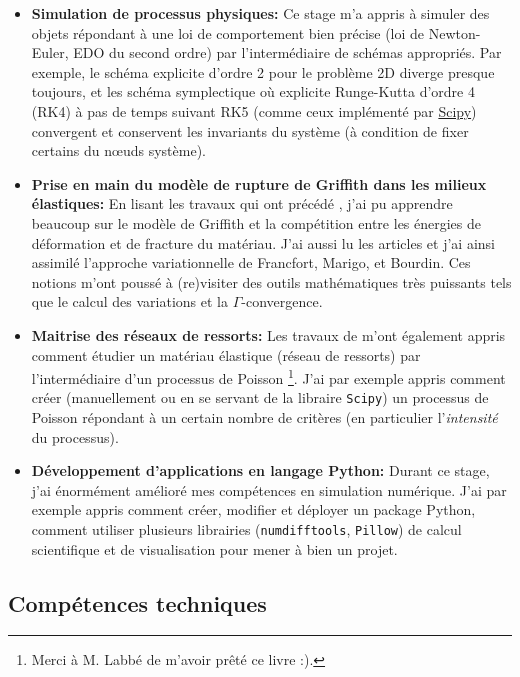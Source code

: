 \begin{itemize}
    \item \textbf{Simulation de processus physiques:} Ce stage m'a appris à simuler des objets répondant à une loi de comportement bien précise (loi de Newton-Euler, EDO du second ordre) par l'intermédiaire de schémas appropriés. Par exemple, le schéma explicite d'ordre 2 pour le problème 2D diverge presque toujours, et les schéma symplectique où explicite Runge-Kutta d'ordre 4 (RK4) à pas de temps suivant RK5 (comme ceux implémenté par \href{https://docs.scipy.org/doc/scipy/reference/generated/scipy.integrate.solve_ivp.html}{Scipy}) convergent et conservent les invariants du système (à condition de fixer certains du n\oe{}uds système).
    \item \textbf{Prise en main du modèle de rupture de Griffith dans les milieux élastiques:} En lisant les travaux qui ont précédé \parencite{balasoiu2020halthesis}, j'ai pu apprendre beaucoup sur le modèle de Griffith et la compétition entre les énergies de déformation et de fracture du matériau. J'ai aussi lu les articles \parencite{francfort1998revisiting,bourdin2008variational} et j'ai ainsi assimilé l'approche variationnelle de Francfort, Marigo, et Bourdin. Ces notions m'ont poussé à (re)visiter des outils mathématiques très puissants tels que le calcul des variations et la $\Gamma$-convergence.
    \item \textbf{Maitrise des réseaux de ressorts:} Les travaux de \citeauthor{balasoiu2020halthesis} m'ont également appris comment étudier un matériau élastique (réseau de ressorts) par l'intermédiaire d'un processus de Poisson \parencite{khasminskii2011stochastic}\footnote{Merci à M. Labbé de m'avoir prêté ce livre :).}. J'ai par exemple appris comment créer (manuellement ou en se servant de la libraire \texttt{Scipy}) un processus de Poisson répondant à un certain nombre de critères (en particulier l'\emph{intensité} du processus).
    \item \textbf{Développement d'applications en langage Python:} Durant ce stage, j'ai énormément amélioré mes compétences en simulation numérique. J'ai par exemple appris comment créer, modifier et déployer un package Python, comment utiliser plusieurs librairies (\texttt{numdifftools}, \texttt{Pillow}) de calcul scientifique et de visualisation pour mener à bien un projet.
\end{itemize}




\subsection{Compétences techniques}

